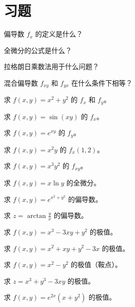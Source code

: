 \section{习题}
\begin{exercise}[0] 偏导数 \(f_x\) 的定义是什么？\end{exercise}
\begin{exercise}[0] 全微分的公式是什么？\end{exercise}
\begin{exercise}[0] 拉格朗日乘数法用于什么问题？\end{exercise}
\begin{exercise}[0] 混合偏导数 \(f_{xy}\) 和 \(f_{yx}\) 在什么条件下相等？\end{exercise}
\begin{exercise}[1] 求 \(f(x,y)=x^2+y^2\) 的 \(f_x\) 和 \(f_y\)。\end{exercise}
\begin{exercise}[1] 求 \(f(x,y)=\sin(xy)\) 的 \(f_x\)。\end{exercise}
\begin{exercise}[1] 求 \(f(x,y)=e^{xy}\) 的 \(f_y\)。\end{exercise}
\begin{exercise}[1] 求 \(f(x,y)=x^2y\) 的 \(f_x(1,2)\)。\end{exercise}
\begin{exercise}[2] 求 \(f(x,y)=x^3y^2\) 的 \(f_{xy}\)。\end{exercise}
\begin{exercise}[2] 求 \(f(x,y)=x\ln y\) 的全微分。\end{exercise}
\begin{exercise}[2] 求 \(f(x,y)=e^{x^2+y^2}\) 的偏导数。\end{exercise}
\begin{exercise}[2] 求 \(z=\arctan\frac{y}{x}\) 的偏导数。\end{exercise}
\begin{exercise}[3] 求 \(f(x,y)=x^3-3xy+y^2\) 的极值。\end{exercise}
\begin{exercise}[3] 求 \(f(x,y)=x^2+xy+y^2-3x\) 的极值。\end{exercise}
\begin{exercise}[3] 求 \(f(x,y)=x^2-y^2\) 的极值（鞍点）。\end{exercise}
\begin{exercise}[3] 求 \(z=x^3+y^3-3xy\) 的极值。\end{exercise}
\begin{exercise}[3] 求 \(f(x,y)=e^{2x}(x+y^2)\) 的极值。\end{exercise}
